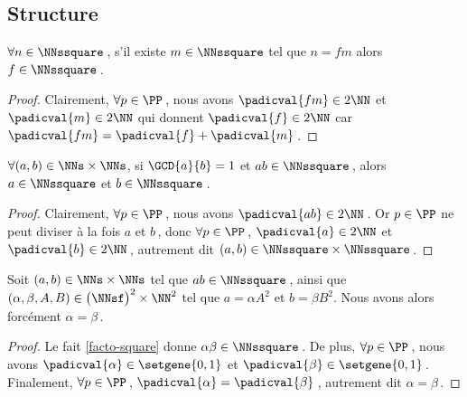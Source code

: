 \subsection{Structure}


\begin{fact} \label{facto-square}
	$\forall n \in \NNssquare$\,, s'il existe $m \in \NNssquare$ tel que $n =  f m$ alors $f  \in \NNssquare$\,.
\end{fact}


\begin{proof}
	Clairement, $\forall p \in \PP$\,, nous avons 
	$\padicval{f m} \in 2 \NN$
	et
	$\padicval{m} \in 2 \NN$
	qui donnent
	$\padicval{f} \in 2 \NN$
	car $\padicval{f m} = \padicval{f} + \padicval{m}$\,.
\end{proof}




\begin{fact} \label{prime-square}
	$\forall (a, b) \in \NNs \times \NNs$, 
	si $\GCD{a}{b} = 1$ et $a b \in \NNssquare$\,,
	alors $a \in \NNssquare$ et $b \in \NNssquare$\,.
\end{fact}


\begin{proof}
	Clairement, $\forall p \in \PP$\,, nous avons $\padicval{ab} \in 2 \NN$\,.
    Or $p \in \PP$ ne peut diviser à la fois $a$ et $b$\,, donc
    $\forall p \in \PP$\,, 
    $\padicval{a} \in 2 \NN$ et $\padicval{b} \in 2 \NN$\,,
    autrement dit 
    $(a, b) \in \NNssquare \times \NNssquare$\,.
\end{proof}




\begin{fact} \label{same-square-free}
	Soit $(a, b) \in \NNs \times \NNs$ tel que $a b \in \NNssquare$\,,
	ainsi que $(\alpha, \beta, A, B) \in \big( \NNsf \big)^2 \times \NN^2$ tel que $a = \alpha A^2$ et $b = \beta B^2$.
	Nous avons alors forcément $\alpha = \beta$\,.
\end{fact}


\begin{proof}
	Le fait \ref{facto-square} donne $\alpha \beta \in \NNssquare$\,.
	De plus, $\forall p \in \PP$\,, nous avons 
	$\padicval{\alpha} \in \setgene{0, 1}$
	et
	$\padicval{\beta} \in \setgene{0, 1}$\,.
	Finalement, $\forall p \in \PP$\,, $\padicval{\alpha} = \padicval{\beta}$\,, autrement dit $\alpha = \beta$\,.
\end{proof}





